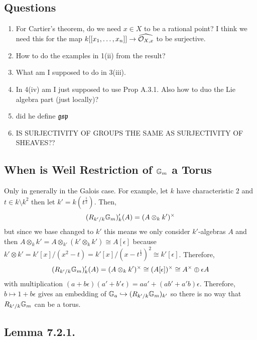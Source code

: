 \documentclass[12pt]{article}
\begin{document}
\subsection{Questions}

\begin{enumerate}
\item For Cartier's theorem, do we need $x \in X$ to be a rational point? I think we need this for the map $k[[x_1, \dots, x_n]] \to \widehat{\mathcal{O}_{X, x}}$ to be surjective.

\item How to do the examples in 1(ii) from the result?

\item What am I supposed to do in 3(iii).

\item In 4(iv) am I just supposed to use Prop A.3.1. Also how to duo the Lie algebra part (just \etale locally)?

\item did he define $\mathfrak{gsp}$

\item IS SURJECTIVITY OF GROUPS THE SAME AS SURJECTIVITY OF SHEAVES??
\end{enumerate}

\subsection{When is Weil Restriction of $\mathbb{G}_m$ a Torus}

Only in generally in the Galois case. For example, let $k$ have characteristic $2$ and $t \in k \setminus k^2$ then let $k' = k(t^{\frac{1}{2}})$. Then,
\[ (R_{k'/k} \mathbb{G}_m)_k'(A) = (A \otimes_k k')^\times \]
but since we base changed to $k'$ this means we only consider $k'$-algebras $A$ and then $A \otimes_k k' = A \otimes_{k'} (k' \otimes_k k') \cong A[\epsilon]$ because $k' \otimes k' = k'[x]/(x^2 - t) = k'[x]/(x - t^{\frac{1}{2}})^2 \cong k'[\epsilon]$. Therefore,
\[ (R_{k'/k} \mathbb{G}_m)_k'(A) = (A \otimes_k k')^\times \cong (A[\epsilon])^\times \cong A^\times \oplus \epsilon A \]
with multiplication $(a + b \epsilon)(a' + b' \epsilon) = aa' + (a b' + a' b) \epsilon$. Therefore, $b \mapsto 1 + b \epsilon$ gives an embedding of $\mathbb{G}_a \hookrightarrow (R_{k'/k} \mathbb{G}_m)_{k'}$ so there is no way that $R_{k'/k} \mathbb{G}_m$ can be a torus.


\subsection{Lemma 7.2.1.}
\end{document}
